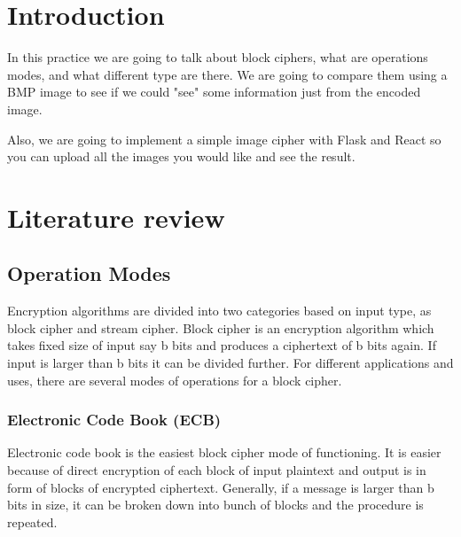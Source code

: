 \documentclass[fleqn, journal, onecolumn]{IEEEtran}             %
\theoremstyle{break}                                            %
\begin{document}
\tableofcontents{}
\label{sec:Index}

\clearpage


\section{Introduction}

  In this practice we are going to talk about block ciphers, what are operations modes, and what different type are there.
  We are going to compare them using a BMP image to see if we could "see" some information just from the encoded image.

  Also, we are going to implement a simple image cipher with Flask and React so you can upload all the images you would like
  and see the result.

\section{Literature review}

  \subsection{Operation Modes}

    Encryption algorithms are divided into two categories based on input type, as block cipher and stream cipher. 
    Block cipher is an encryption algorithm which takes fixed size of input say b bits and produces a ciphertext 
    of b bits again. If input is larger than b bits it can be divided further. For different applications and uses, 
    there are several modes of operations for a block cipher. \\[0.2cm]

      \subsubsection{Electronic Code Book (ECB)}
      
        Electronic code book is the easiest block cipher mode of functioning. 
        It is easier because of direct encryption of each block of input plaintext
        and output is in form of blocks of encrypted ciphertext. Generally,
        if a message is larger than b bits in size, it can be broken down
        into bunch of blocks and the procedure is repeated.
\end{document}
